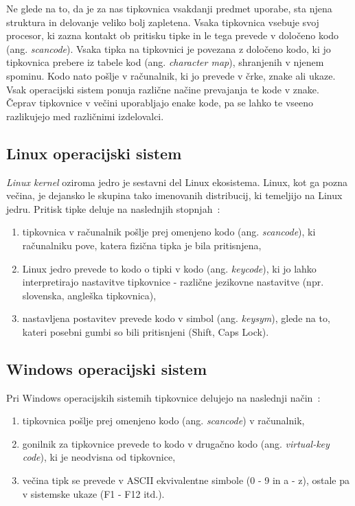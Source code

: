 

  Ne glede na to, da je za nas tipkovnica vsakdanji predmet uporabe, sta njena struktura in delovanje veliko bolj zapletena.
  Vsaka tipkovnica vsebuje svoj procesor, ki zazna kontakt ob pritisku tipke in le tega prevede v določeno kodo (ang. \emph{scancode}).
  Vsaka tipka na tipkovnici je povezana z določeno kodo, ki jo tipkovnica prebere iz tabele kod (ang. \emph{character map}), shranjenih v njenem spominu.
  Kodo nato pošlje v računalnik, ki jo prevede v črke, znake ali ukaze.
  Vsak operacijski sistem ponuja različne načine prevajanja te kode v znake.
  Čeprav tipkovnice v večini uporabljajo enake kode, pa se lahko te vseeno razlikujejo med različnimi izdelovalci.

  \subsection{Linux operacijski sistem}\label{subsec:linux-operacijski-sistem}

  \emph{Linux kernel} oziroma jedro je sestavni del Linux ekosistema.
  Linux, kot ga pozna večina, je dejansko le skupina tako imenovanih distribucij,
  ki temeljijo na Linux jedru.
  Pritisk tipke deluje na naslednjih stopnjah~\cite{arch_wiki}:

  \begin{enumerate}
    \item tipkovnica v računalnik pošlje prej omenjeno kodo (ang. \emph{scancode}), ki računalniku pove, katera fizična tipka je bila pritisnjena,
    \item Linux jedro prevede to kodo o tipki v kodo (ang. \emph{keycode}), ki jo lahko interpretirajo nastavitve tipkovnice - različne jezikovne nastavitve (npr. slovenska, angleška tipkovnica),
    \item nastavljena postavitev prevede kodo v simbol (ang. \emph{keysym}), glede na to, kateri posebni gumbi so bili pritisnjeni (Shift, Caps Lock).
  \end{enumerate}

  \subsection{Windows operacijski sistem}\label{subsec:windows-operacijski-sistem}

  Pri Windows operacijskih sistemih tipkovnice delujejo na naslednji način~\cite{win_keyboard}:

  \begin{enumerate}
    \item tipkovnica pošlje prej omenjeno kodo (ang. \emph{scancode}) v računalnik,
    \item gonilnik za tipkovnice prevede to kodo v drugačno kodo (ang. \emph{virtual-key code}), ki je neodvisna od tipkovnice,
    \item večina tipk se prevede v ASCII ekvivalentne simbole (0 - 9 in a - z), ostale pa v sistemske ukaze (F1 - F12 itd.).
  \end{enumerate}

